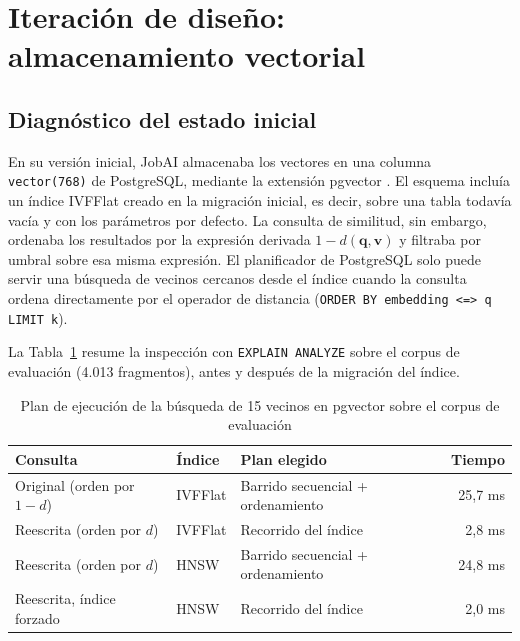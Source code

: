 \section{Iteración de diseño: almacenamiento vectorial}
\label{sec:art-vectorial}

\subsection{Diagnóstico del estado inicial}

En su versión inicial, JobAI almacenaba los vectores en una columna \texttt{vector(768)} de PostgreSQL, mediante la extensión pgvector \citep{Pgvector}. El esquema incluía un índice IVFFlat creado en la migración inicial, es decir, sobre una tabla todavía vacía y con los parámetros por defecto. La consulta de similitud, sin embargo, ordenaba los resultados por la expresión derivada $1 - d(\mathbf{q}, \mathbf{v})$ y filtraba por umbral sobre esa misma expresión. El planificador de PostgreSQL solo puede servir una búsqueda de vecinos cercanos desde el índice cuando la consulta ordena directamente por el operador de distancia (\texttt{ORDER BY embedding <=> q LIMIT k}).

La Tabla~\ref{tab:art-explain} resume la inspección con \texttt{EXPLAIN ANALYZE} sobre el corpus de evaluación (4.013 fragmentos), antes y después de la migración del índice.

\begin{table}[htbp!]
    \centering
    \caption{Plan de ejecución de la búsqueda de 15 vecinos en pgvector sobre el corpus de evaluación}
    \label{tab:art-explain}
    \begin{tabular}{|p{5.2cm}|p{2.2cm}|p{4.6cm}|r|}
        \hline
        \textbf{Consulta} & \textbf{Índice} & \textbf{Plan elegido} & \textbf{Tiempo} \\
        \hline
        Original (orden por $1-d$) & IVFFlat & Barrido secuencial + ordenamiento & 25,7 ms \\
        \hline
        Reescrita (orden por $d$) & IVFFlat & Recorrido del índice & 2,8 ms \\
        \hline
        Reescrita (orden por $d$) & HNSW & Barrido secuencial + ordenamiento & 24,8 ms \\
        \hline
        Reescrita, índice forzado & HNSW & Recorrido del índice & 2,0 ms \\
        \hline
    \end{tabular}
\end{table}

